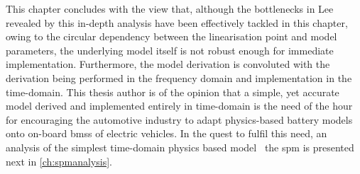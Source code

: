 

This  chapter  concludes  with  the  view  that,  although  the  bottlenecks  in
Lee~\etal~\cite{Lee2012a}  revealed   by  this   in-depth  analysis   have  been
effectively tackled  in this chapter,  owing to the circular  dependency between
the linearisation point and model parameters, the underlying model itself is not
robust enough for immediate implementation. Furthermore, the model derivation is
convoluted  with the  derivation being  performed  in the  frequency domain  and
implementation in the  time-domain. This thesis author is of  the opinion that a
simple, yet  accurate model derived  and implemented entirely in  time-domain is
the  need  of  the  hour  for  encouraging  the  automotive  industry  to  adapt
physics-based battery models onto on-board  \glspl{bms} of electric vehicles. In
the quest to  fulfil this need, an analysis of  the simplest time-domain physics
based model \viz~the \gls{spm} is presented next in \cref{ch:spmanalysis}.
